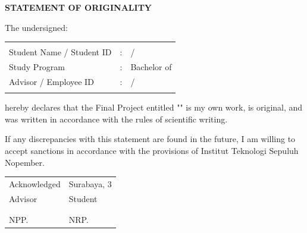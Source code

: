 \begin{center}
	\large
	\textbf{STATEMENT OF ORIGINALITY}
\end{center}

\thispagestyle{empty}

\vspace{2ex}


\noindent The undersigned:

\noindent\begin{tabularx}{\textwidth}{l l X}
	&   &                            \\
	Student Name / Student ID   & : & \name{} / \nrp{}           \\
	Study Program             & : & Bachelor of \engstudyprogram{}              \\
	Advisor / Employee ID & : & \advisor{} / \advisornip{} \\
	&   &                            \\
\end{tabularx}

\noindent
hereby declares that the Final Project entitled "\engtatitle{}" is my own work, is original, and was written in accordance with the rules of scientific writing.

\noindent
If any discrepancies with this statement are found in the future, I am willing to accept sanctions in accordance with the provisions of Institut Teknologi Sepuluh Nopember.

\vspace{5ex}

\noindent
\begin{tabularx}{\textwidth}{ >{\centering\arraybackslash}X >{\centering\arraybackslash}X }

	Acknowledged & Surabaya, 3 \ENGMONTH{} \the\year{} \\
	Advisor & Student \\

	\\[2.5cm]

	\textbf{\advisor{}} & \textbf{\name{}} \\
	NPP. \advisornip{} & NRP. \nrp{} \\


%
%

\end{tabularx}